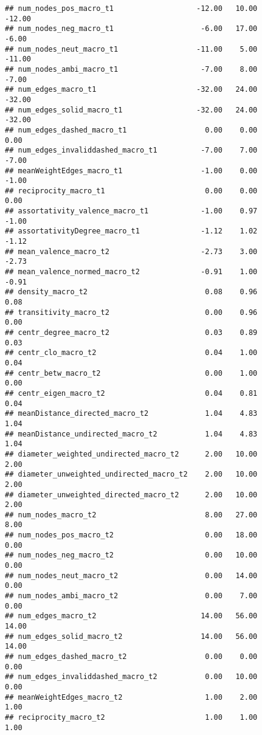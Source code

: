 \documentclass[
]{article}
\begin{document}
\begin{verbatim}
## num_nodes_pos_macro_t1                   -12.00   10.00         -12.00
## num_nodes_neg_macro_t1                    -6.00   17.00          -6.00
## num_nodes_neut_macro_t1                  -11.00    5.00         -11.00
## num_nodes_ambi_macro_t1                   -7.00    8.00          -7.00
## num_edges_macro_t1                       -32.00   24.00         -32.00
## num_edges_solid_macro_t1                 -32.00   24.00         -32.00
## num_edges_dashed_macro_t1                  0.00    0.00           0.00
## num_edges_invaliddashed_macro_t1          -7.00    7.00          -7.00
## meanWeightEdges_macro_t1                  -1.00    0.00          -1.00
## reciprocity_macro_t1                       0.00    0.00           0.00
## assortativity_valence_macro_t1            -1.00    0.97          -1.00
## assortativityDegree_macro_t1              -1.12    1.02          -1.12
## mean_valence_macro_t2                     -2.73    3.00          -2.73
## mean_valence_normed_macro_t2              -0.91    1.00          -0.91
## density_macro_t2                           0.08    0.96           0.08
## transitivity_macro_t2                      0.00    0.96           0.00
## centr_degree_macro_t2                      0.03    0.89           0.03
## centr_clo_macro_t2                         0.04    1.00           0.04
## centr_betw_macro_t2                        0.00    1.00           0.00
## centr_eigen_macro_t2                       0.04    0.81           0.04
## meanDistance_directed_macro_t2             1.04    4.83           1.04
## meanDistance_undirected_macro_t2           1.04    4.83           1.04
## diameter_weighted_undirected_macro_t2      2.00   10.00           2.00
## diameter_unweighted_undirected_macro_t2    2.00   10.00           2.00
## diameter_unweighted_directed_macro_t2      2.00   10.00           2.00
## num_nodes_macro_t2                         8.00   27.00           8.00
## num_nodes_pos_macro_t2                     0.00   18.00           0.00
## num_nodes_neg_macro_t2                     0.00   10.00           0.00
## num_nodes_neut_macro_t2                    0.00   14.00           0.00
## num_nodes_ambi_macro_t2                    0.00    7.00           0.00
## num_edges_macro_t2                        14.00   56.00          14.00
## num_edges_solid_macro_t2                  14.00   56.00          14.00
## num_edges_dashed_macro_t2                  0.00    0.00           0.00
## num_edges_invaliddashed_macro_t2           0.00   10.00           0.00
## meanWeightEdges_macro_t2                   1.00    2.00           1.00
## reciprocity_macro_t2                       1.00    1.00           1.00

\end{verbatim}
\end{document}
